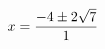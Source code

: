\documentclass[preview]{standalone}
\begin{document}
\begin{align*}
\special{dvisvgm:raw <g id='unique000'>}x=\frac{-4\pm{2 \sqrt{7}}}{1}\special{dvisvgm:raw </g>}
\end{align*}
\end{document}
